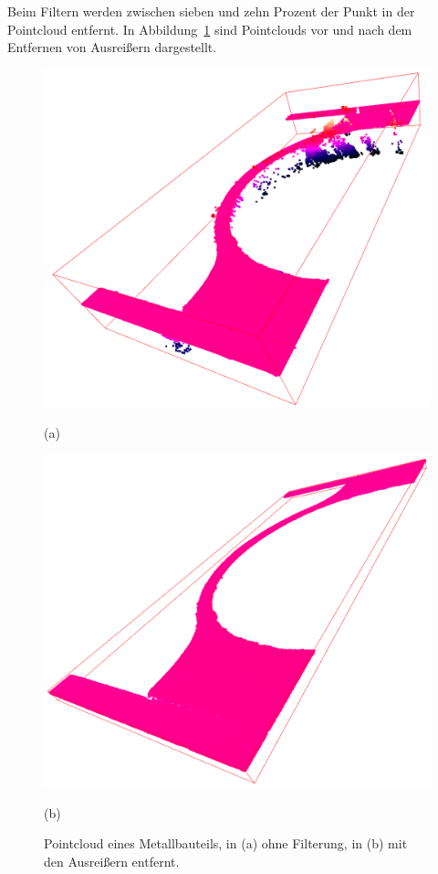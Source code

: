 Beim Filtern werden zwischen sieben und zehn Prozent der Punkt in der Pointcloud entfernt.
In Abbildung~\ref{fig:pcs} sind Pointclouds vor und nach dem Entfernen von Ausreißern 
dargestellt.

\begin{figure}[H]
    \centering
    \begin{minipage}{0.45\textwidth}
        \centering
        \includegraphics[width=\textwidth]{images/pc_with_outliers.PNG} %
        \caption*{(a)}
    \end{minipage}\hfill
    \begin{minipage}{0.45\textwidth}
        \centering
        \includegraphics[width=\textwidth]{images/pc_without_outliers.PNG} %
        \caption*{(b)}
    \end{minipage}
    \caption{Pointcloud eines Metallbauteils, in (a) ohne Filterung,
    in (b) mit den Ausreißern entfernt.}
    \label{fig:pcs}
\end{figure}


